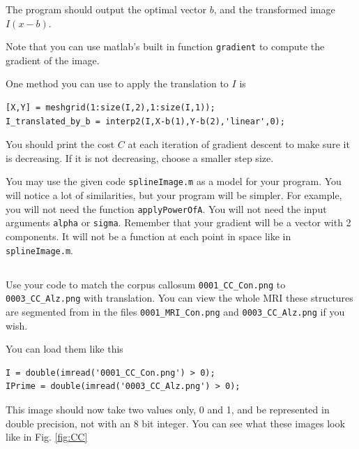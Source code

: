 \documentclass[17pt,landscape]{extarticle}
\begin{document}
The program should output the optimal vector $b$, and the transformed image $I(x - b)$.

Note that you can use matlab's built in function \verb$gradient$ to compute the gradient of the image.

One method you can use to apply the translation to $I$ is
\begin{verbatim}
[X,Y] = meshgrid(1:size(I,2),1:size(I,1));
I_translated_by_b = interp2(I,X-b(1),Y-b(2),'linear',0);
\end{verbatim}

You should print the cost $C$ at each iteration of gradient descent to make sure it is decreasing.  If it is not decreasing, choose a smaller step size.

You may use the given code \verb$splineImage.m$ as a model for your program.  You will notice a lot of similarities, but your program will be simpler.  For example, you will not need the function \verb$applyPowerOfA$.  You will not need the input arguments \verb$alpha$ or \verb$sigma$.  Remember that your gradient will be a vector with 2 components.  It will not be a function at each point in space like in \verb$splineImage.m$.

\subsection{}
Use your code to match the corpus callosum \verb$0001_CC_Con.png$ to \verb$0003_CC_Alz.png$ with translation.  You can view the whole MRI these structures are segmented from in the files \verb$0001_MRI_Con.png$ and \verb$0003_CC_Alz.png$ if you wish.

You can load them like this 
\begin{verbatim}
I = double(imread('0001_CC_Con.png') > 0);
IPrime = double(imread('0003_CC_Alz.png') > 0);
\end{verbatim}
This image should now take two values only, 0 and 1, and be represented in double precision, not with an 8 bit integer.  You can see what these images look like in Fig. \ref{fig:CC}
\end{document}
